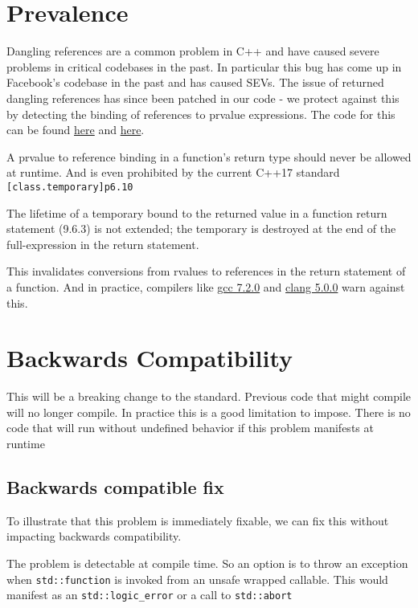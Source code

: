 \documentclass{article}
\begin{document}
\section{Prevalence}
Dangling references are a common problem in C++ and have caused severe
problems in critical codebases in the past.  In particular this bug has come
up in Facebook's codebase in the past and has caused SEVs.  The issue of
returned dangling references has since been patched in our code -
we protect against this by detecting the binding of references to prvalue
expressions.  The code for this can be found
\href{https://goo.gl/iyjDA9}{here} and \href{https://goo.gl/GAvi5j}{here}.

A prvalue to reference binding in a function's return type should never be
allowed at runtime.  And is even prohibited by the current C++17 standard
\texttt{[class.temporary]p6.10}
\begin{displayquote}
The lifetime of a temporary bound to the returned value in a function return
statement (9.6.3) is not extended; the temporary is destroyed at the end of
the full-expression in the return statement.
\end{displayquote}

This invalidates conversions from rvalues to references in the return
statement of a function.  And in practice, compilers like
\href{fucntio://wandbox.org/permlink/vRKLn2OoolPzeW44}{gcc 7.2.0} and
\href{https://wandbox.org/permlink/lOCOoY0qnSJwIQ8j}{clang 5.0.0} warn against
this.

\section{Backwards Compatibility}
This will be a breaking change to the standard.  Previous code that might
compile will no longer compile.  In practice this is a good limitation to
impose.  There is no code that will run without undefined behavior if this
problem manifests at runtime

\subsection{Backwards compatible fix}
To illustrate that this problem is immediately fixable, we can fix this
without impacting backwards compatibility.

The problem is detectable at compile time.  So an option is to throw an
exception when \texttt{std::function} is invoked from an unsafe wrapped
callable.  This would manifest as an \texttt{std::logic\_error} or a call to
\texttt{std::abort}
\end{document}
